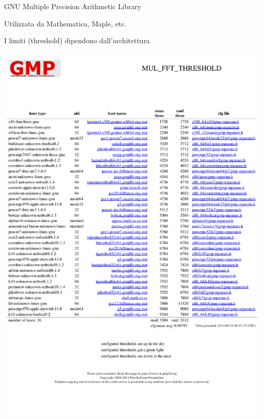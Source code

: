 \begin{frame}{GNU Multiple Precision Arithmetic Library}

\BI
\item Utilizzata da Mathematica, Maple, etc.
\item I limiti (threshold) dipendono dall'architettura
\EI

\includegraphics[width=\textwidth]{threshold.pdf}

\end{frame}

